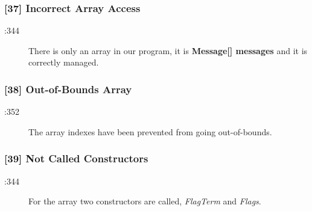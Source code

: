 \subsubsection{[37] Incorrect Array Access}
\begin{description}
	\item[:344] There is only an array in our program, it is \textbf{Message[] messages} and it is correctly managed.
\end{description}

\subsubsection{[38] Out-of-Bounds Array}
\begin{description}
	\item[:352] The array indexes have been prevented from going out-of-bounds.
\end{description}

\subsubsection{[39] Not Called Constructors}
\begin{description}
	\item[:344] For the array two constructors are called, \textit{FlagTerm} and \textit{Flags}.
\end{description}


